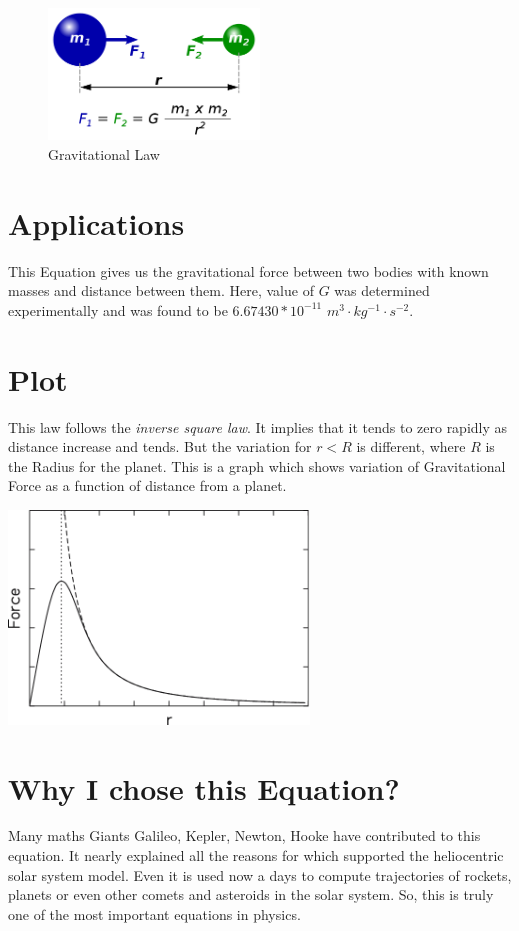 \documentclass{article}
\begin{document}
\begin{figure}
  \centering
  \includegraphics[width=0.5\textwidth]{Newtons law image.png}
  \caption{Gravitational Law}
  \label{fig:image}
\end{figure}


\section{Applications}
This Equation gives us the gravitational force between two bodies with known masses and distance between them. Here, value of \(G\) was determined experimentally and was found to be \(6.67430 * 10^{-11}\) \(m^{3} \cdot kg^{-1} \cdot s^{-2}\). 

\section{Plot}
This law follows the \emph{inverse square law}. It implies that it tends to zero rapidly as distance increase and tends. But the variation for \(r<R\) is different, where \(R\) is the Radius for the planet. This is a graph which shows variation of Gravitational Force as a function of distance from a planet.

\begin{center}
    \includegraphics[width=0.6\textwidth]{newtons law graph.png}
\end{center}

\section{Why I chose this Equation?}
Many maths Giants Galileo, Kepler, Newton, Hooke have contributed to this equation. It nearly explained all the reasons for which supported the heliocentric solar system model. Even it is used now a days to compute trajectories of rockets, planets or even other comets and asteroids in the solar system. So, this is truly one of the most important equations in physics. 
\end{document}
